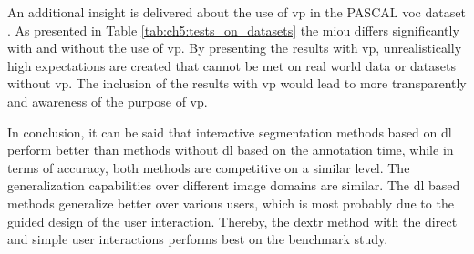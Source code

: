 An additional insight is delivered about the use of \gls{vp} in the PASCAL \gls{voc} dataset \cite{Eve20-PascalVOC}.
As presented in Table \ref{tab:ch5:tests_on_datasets} the \gls{miou} differs significantly with and without the use of \gls{vp}.
By presenting the results with \gls{vp}, unrealistically high expectations are created that cannot be met on real world data or datasets without \gls{vp}.
The inclusion of the results with \gls{vp} would lead to more transparently and awareness of the purpose of \gls{vp}.

In conclusion, it can be said that interactive segmentation methods based on \gls{dl} perform better than methods without \gls{dl} based on the annotation time, while in terms of accuracy, both methods are competitive on a similar level.
The generalization capabilities over different image domains are similar.
The \gls{dl} based methods generalize better over various users, which is most probably due to the guided design of the user interaction.
Thereby, the \gls{dextr} method with the direct and simple user interactions performs best on the benchmark study.


 